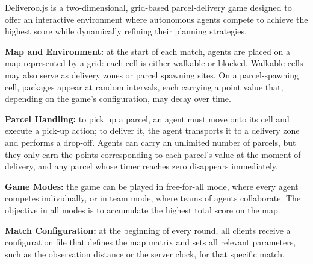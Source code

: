 Deliveroo.js is a two-dimensional, grid-based parcel‐delivery game designed to offer an interactive environment where autonomous agents compete to achieve the highest score while dynamically refining their planning strategies.

\bigskip

\textbf{Map and Environment:} at the start of each match, agents are placed on a map represented by a grid: each cell is either walkable or blocked. Walkable cells may also serve as delivery zones or parcel spawning sites. On a parcel-spawning cell, packages appear at random intervals, each carrying a point value that, depending on the game’s configuration, may decay over time.

\bigskip

\textbf{Parcel Handling:} to pick up a parcel, an agent must move onto its cell and execute a pick-up action; to deliver it, the agent transports it to a delivery zone and performs a drop-off. Agents can carry an unlimited number of parcels, but they only earn the points corresponding to each parcel's value at the moment of delivery, and any parcel whose timer reaches zero disappears immediately.

\bigskip

\textbf{Game Modes:} the game can be played in free-for-all mode, where every agent competes individually, or in team mode, where teams of agents collaborate. The objective in all modes is to accumulate the highest total score on the map.

\bigskip

\textbf{Match Configuration:} at the beginning of every round, all clients receive a configuration file that defines the map matrix and sets all relevant parameters, such as the observation distance or the server clock, for that specific match.
